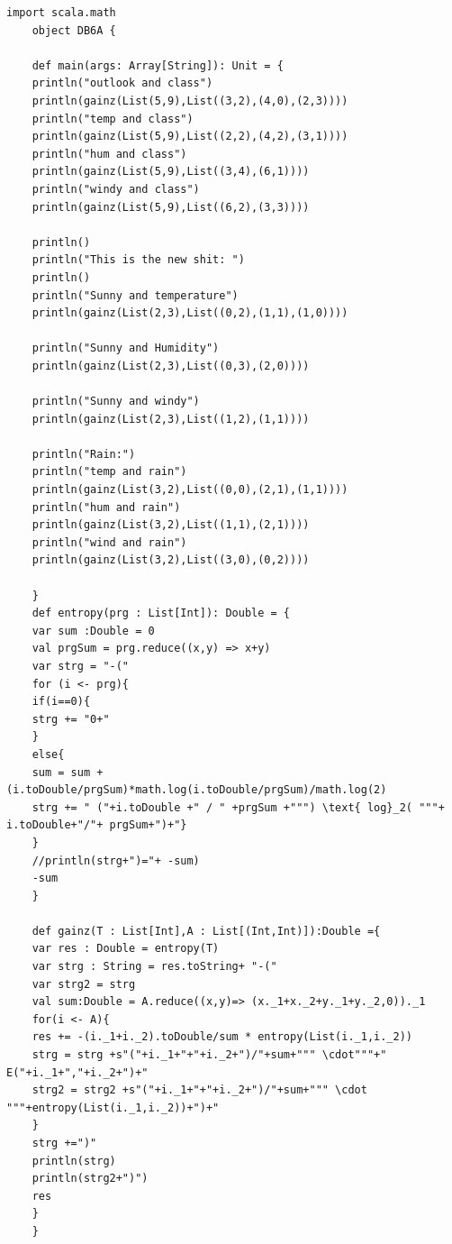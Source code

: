 \documentclass{article}
\theoremstyle{remark}
\begin{document}
	\begin{lstlisting}[caption = Task A]
	import scala.math
	object DB6A {
	
	def main(args: Array[String]): Unit = {
	println("outlook and class")
	println(gainz(List(5,9),List((3,2),(4,0),(2,3))))
	println("temp and class")
	println(gainz(List(5,9),List((2,2),(4,2),(3,1))))
	println("hum and class")
	println(gainz(List(5,9),List((3,4),(6,1))))
	println("windy and class")
	println(gainz(List(5,9),List((6,2),(3,3))))
	
	println()
	println("This is the new shit: ")
	println()
	println("Sunny and temperature")
	println(gainz(List(2,3),List((0,2),(1,1),(1,0))))
	
	println("Sunny and Humidity")
	println(gainz(List(2,3),List((0,3),(2,0))))
	
	println("Sunny and windy")
	println(gainz(List(2,3),List((1,2),(1,1))))
	
	println("Rain:")
	println("temp and rain")
	println(gainz(List(3,2),List((0,0),(2,1),(1,1))))
	println("hum and rain")
	println(gainz(List(3,2),List((1,1),(2,1))))
	println("wind and rain")
	println(gainz(List(3,2),List((3,0),(0,2))))
	
	}
	def entropy(prg : List[Int]): Double = {
	var sum :Double = 0
	val prgSum = prg.reduce((x,y) => x+y)
	var strg = "-("
	for (i <- prg){
	if(i==0){
	strg += "0+"
	}
	else{
	sum = sum + (i.toDouble/prgSum)*math.log(i.toDouble/prgSum)/math.log(2)
	strg += " ("+i.toDouble +" / " +prgSum +""") \text{ log}_2( """+ i.toDouble+"/"+ prgSum+")+"}
	}
	//println(strg+")="+ -sum)
	-sum
	}
	
	def gainz(T : List[Int],A : List[(Int,Int)]):Double ={
	var res : Double = entropy(T)
	var strg : String = res.toString+ "-("
	var strg2 = strg
	val sum:Double = A.reduce((x,y)=> (x._1+x._2+y._1+y._2,0))._1
	for(i <- A){
	res += -(i._1+i._2).toDouble/sum * entropy(List(i._1,i._2))
	strg = strg +s"("+i._1+"+"+i._2+")/"+sum+""" \cdot"""+" E("+i._1+","+i._2+")+"
	strg2 = strg2 +s"("+i._1+"+"+i._2+")/"+sum+""" \cdot """+entropy(List(i._1,i._2))+")+"
	}
	strg +=")"
	println(strg)
	println(strg2+")")
	res
	}
	}
	\end{lstlisting}
	\newpage
\end{document}
